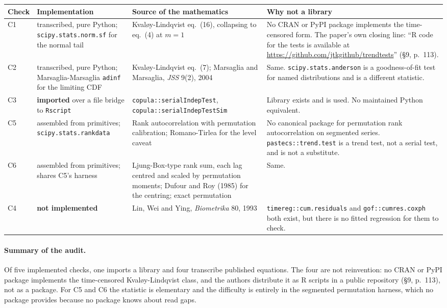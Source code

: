 \documentclass[11pt,a4paper]{article}
\begin{document}
\begin{center}
\small
\begin{tabular}{@{}p{}p{}p{}p{}@{}}
\toprule
\textbf{Check} & \textbf{Implementation} & \textbf{Source of the mathematics} &
\textbf{Why not a library}\\
\midrule
C1 & transcribed, pure Python; \texttt{scipy.stats.norm.sf} for the normal tail &
Kvaløy-Lindqvist eq.~(16), collapsing to eq.~(4) at $m=1$ &
No CRAN or PyPI package implements the time-censored form. The paper's own closing line:
\enquote{R code for the tests is available at \url{https://github.com/jtkgithub/trendtests}}
(\S 9, p.~113).\\[3pt]
C2 & transcribed, pure Python; Marsaglia-Marsaglia \texttt{adinf} for the limiting CDF &
Kvaløy-Lindqvist eq.~(7); Marsaglia and Marsaglia, \emph{JSS} 9(2), 2004 &
Same. \texttt{scipy.stats.anderson} is a goodness-of-fit test for named distributions and
is a different statistic.\\[3pt]
C3 & \textbf{imported} over a file bridge to \texttt{Rscript} &
\texttt{copula::serialIndepTest}, \texttt{copula::serialIndepTestSim} &
Library exists and is used. No maintained Python equivalent.\\[3pt]
C5 & assembled from primitives; \texttt{scipy.stats.rankdata} &
Rank autocorrelation with permutation calibration; Romano-Tirlea for the level caveat &
No canonical package for permutation rank autocorrelation on segmented series.
\texttt{pastecs::trend.test} is a trend test, not a serial test, and is not a
substitute.\\[3pt]
C6 & assembled from primitives; shares C5's harness &
Ljung-Box-type rank sum, each lag centred and scaled by permutation moments; Dufour and
Roy (1985) for the centring; exact permutation &
Same.\\[3pt]
C4 & \textbf{not implemented} &
Lin, Wei and Ying, \emph{Biometrika} 80, 1993 &
\texttt{timereg::cum.residuals} and \texttt{gof::cumres.coxph} both exist, but there is
no fitted regression for them to check.\\
\bottomrule
\end{tabular}
\end{center}

\paragraph{Summary of the audit.} Of five implemented checks, one imports a library and
four transcribe published equations. The four are not reinvention: no CRAN or PyPI
package implements the time-censored Kvaløy-Lindqvist class, and the authors distribute it
as R scripts in a public repository (\S 9, p.~113), not as a package. For C5 and C6 the statistic is elementary and
the difficulty is entirely in the segmented permutation harness, which no package
provides because no package knows about read gaps.
\end{document}
